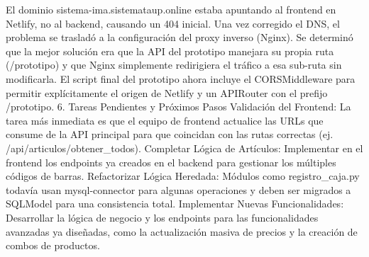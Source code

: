 El dominio sistema-ima.sistemataup.online estaba apuntando al frontend en Netlify, no al backend, causando un 404 inicial.
Una vez corregido el DNS, el problema se trasladó a la configuración del proxy inverso (Nginx).
Se determinó que la mejor solución era que la API del prototipo manejara su propia ruta (/prototipo) y que Nginx simplemente redirigiera el tráfico a esa sub-ruta sin modificarla.
El script final del prototipo ahora incluye el CORSMiddleware para permitir explícitamente el origen de Netlify y un APIRouter con el prefijo /prototipo.
6. Tareas Pendientes y Próximos Pasos
Validación del Frontend: La tarea más inmediata es que el equipo de frontend actualice las URLs que consume de la API principal para que coincidan con las rutas correctas (ej. /api/articulos/obtener_todos).
Completar Lógica de Artículos: Implementar en el frontend los endpoints ya creados en el backend para gestionar los múltiples códigos de barras.
Refactorizar Lógica Heredada: Módulos como registro_caja.py todavía usan mysql-connector para algunas operaciones y deben ser migrados a SQLModel para una consistencia total.
Implementar Nuevas Funcionalidades: Desarrollar la lógica de negocio y los endpoints para las funcionalidades avanzadas ya diseñadas, como la actualización masiva de precios y la creación de combos de productos.



